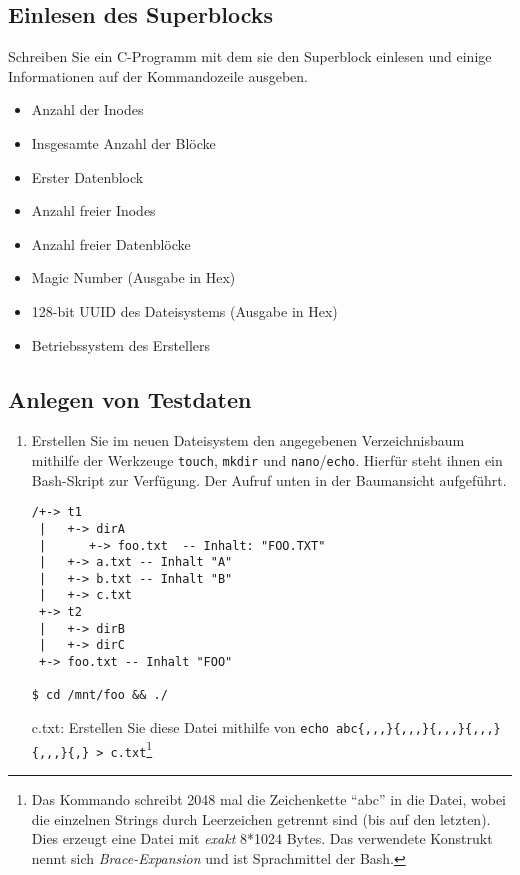 \documentclass[11pt,a4paper]{article}
\def\inlinebash{\lstinline[style=bash]}
\begin{document}
\subsection{Einlesen des Superblocks}
Schreiben Sie ein C-Programm mit dem sie den Superblock einlesen und
einige Informationen auf der Kommandozeile ausgeben.

\begin{itemize}
	\item Anzahl der Inodes
	\item Insgesamte Anzahl der Blöcke
	\item Erster Datenblock
	\item Anzahl freier Inodes
	\item Anzahl freier Datenblöcke
	\item Magic Number (Ausgabe in Hex)
	\item 128-bit UUID des Dateisystems (Ausgabe in Hex)
	\item Betriebssystem des Erstellers
\end{itemize}

\subsection{Anlegen von Testdaten}

\begin{enumerate}
\item Erstellen Sie im neuen Dateisystem den angegebenen Verzeichnisbaum 
	mithilfe der Werkzeuge \inlinebash$touch$, \inlinebash$mkdir$ und 
	\inlinebash$nano$\slash\inlinebash$echo$. Hierfür steht ihnen ein Bash-Skript 
	zur Verfügung. Der Aufruf unten in der Baumansicht aufgeführt.

\begin{verbatim}
/+-> t1
 |   +-> dirA
 |      +-> foo.txt  -- Inhalt: "FOO.TXT"
 |   +-> a.txt -- Inhalt "A"
 |   +-> b.txt -- Inhalt "B" 
 |   +-> c.txt 
 +-> t2
 |   +-> dirB
 |   +-> dirC
 +-> foo.txt -- Inhalt "FOO"
 
$ cd /mnt/foo && ./
\end{verbatim}


	c.txt: Erstellen Sie diese Datei mithilfe von
	\inlinebash$echo abc{,,,}{,,,}{,,,}{,,,}{,,,}{,} > c.txt$\footnote{Das Kommando 
	schreibt 2048 mal die Zeichenkette ``abc'' in die Datei, wobei die einzelnen
	Strings durch Leerzeichen getrennt sind (bis auf den letzten). 
	Dies erzeugt eine Datei mit \emph{exakt} 8*1024 Bytes.
	Das verwendete Konstrukt nennt sich \emph{Brace-Expansion} 
	und ist Sprachmittel der Bash.}
\end{enumerate}
\end{document}
